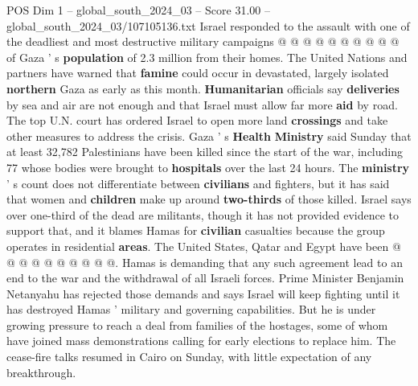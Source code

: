 \begin{textsample}{POS Dim 1 – global\_south\_2024\_03 – Score 31.00 – global\_south\_2024\_03/107105136.txt}
Israel responded to the assault with one of the deadliest and most destructive military campaigns @ @ @ @ @ @ @ @ @ @ of Gaza ' s \textbf{population} of 2.3 million from their homes.
The United Nations and partners have warned that \textbf{famine} could occur in devastated, largely isolated \textbf{northern} Gaza as early as this month. \textbf{Humanitarian} officials say \textbf{deliveries} by sea and air are not enough and that Israel must allow far more \textbf{aid} by road.
The top U.N. court has ordered Israel to open more land \textbf{crossings} and take other measures to address the crisis.
Gaza ' s \textbf{Health} \textbf{Ministry} said Sunday that at least 32,782 Palestinians have been killed since the start of the war, including 77 whose bodies were brought to \textbf{hospitals} over the last 24 hours.
The \textbf{ministry} ' s count does not differentiate between \textbf{civilians} and fighters, but it has said that women and \textbf{children} make up around \textbf{two-thirds} of those killed.
Israel says over one-third of the dead are militants, though it has not provided evidence to support that, and it blames Hamas for \textbf{civilian} casualties because the group operates in residential \textbf{areas}.
The United States, Qatar and Egypt have been @ @ @ @ @ @ @ @ @ @.
Hamas is demanding that any such agreement lead to an end to the war and the withdrawal of all Israeli forces.
Prime Minister Benjamin Netanyahu has rejected those demands and says Israel will keep fighting until it has destroyed Hamas ' military and governing capabilities.
But he is under growing pressure to reach a deal from families of the hostages, some of whom have joined mass demonstrations calling for early elections to replace him.
The cease-fire talks resumed in Cairo on Sunday, with little expectation of any breakthrough.

\end{textsample}

